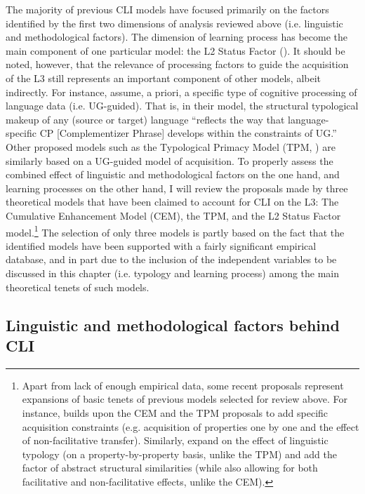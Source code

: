 \documentclass[output=paper,modfonts,nonflat,newtxmath]{langsci/langscibook}
\begin{document}
The majority of previous CLI models have focused primarily on the factors identified by the first two dimensions of analysis reviewed above (i.e. linguistic and methodological factors). The dimension of learning process has become the main component of one particular model: the L2 Status Factor (\citealt{BardelFalk2007, BardelFalk2012, FalkBardel2010, FalkBardel2011}). It should be noted, however, that the relevance of processing factors to guide the acquisition of the L3 still represents an important component of other models, albeit indirectly. For instance, \citet[9]{BerkesFlynn2012} assume, a priori, a specific type of cognitive processing of language data (i.e. UG-guided). That is, in their model, the structural typological makeup of any (source or target) language “reflects the way that language-specific CP [Complementizer Phrase] develops within the constraints of UG.” Other proposed models such as the Typological Primacy Model (TPM, \citealt{Rothman2011, Rothman2015}) are similarly based on a UG-guided model of acquisition. To properly assess the combined effect of linguistic and methodological factors on the one hand, and learning processes on the other hand, I will review the proposals made by three theoretical models that have been claimed to account for CLI on the L3: The Cumulative Enhancement Model (CEM), the TPM, and the L2 Status Factor model.\footnote{Apart from lack of enough empirical data, some recent proposals represent expansions of basic tenets of previous models selected for review above. For instance, \citet{Slabakova2017} builds upon the CEM and the TPM proposals to add specific acquisition constraints (e.g. acquisition of properties one by one and the effect of non-facilitative transfer). Similarly, \citet{WestergaardEtAl2017} expand on the effect of linguistic typology (on a property-by-property basis, unlike the TPM) and add the factor of abstract structural similarities (while also allowing for both facilitative and non-facilitative effects, unlike the CEM).} The selection of only three models is partly based on the fact that the identified models have been supported with a fairly significant empirical database, and in part due to the inclusion of the independent variables to be discussed in this chapter (i.e. typology and learning process) among the main theoretical tenets of such models.

\subsection{{Linguistic} {and} {methodological} {factors} {behind} {CLI}} %
\label{sec:salaberry:2.1}
\end{document}
